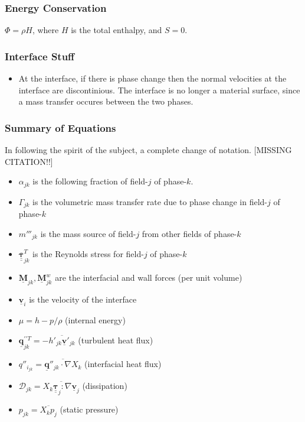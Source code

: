 \documentclass[11pt]{article}
\begin{document}
\subsubsection{Energy Conservation}
$\Phi=\rho H$, where $H$ is the total enthalpy, and $S = 0$. 
\subsubsection{Interface Stuff}
\begin{itemize}
	\item At the interface, if there is phase change then the normal velocities at the interface are discontinious. The interface is no longer a material surface, since a mass transfer occures between the two phases.
\end{itemize}

\subsubsection{Summary of Equations}
In following the spirit of the subject, a complete change of notation. [MISSING CITATION!!]
\begin{itemize}
	\item $\alpha_{jk}$ is the following fraction of field-$j$ of phase-$k$.
	\item $\Gamma_{jk}$ is the volumetric mass transfer rate due to phase change in field-$j$ of phase-$k$
	\item $m'''_{jk}$ is the mass source of field-$j$ from other fields of phase-$k$
	\item $\underline{\underline{\overline{\mathbf{\tau}}}}_{jk}^T$ is the Reynolds stress for field-$j$ of phase-$k$
	\item $\underline{\mathbf{M}}_{jk}, \underline{\mathbf{M}}_{jk}^{w}$ are the interfacial and wall forces (per unit volume)
	\item $\underline{\mathbf{v}}_{i}$ is the velocity of the interface
	\item $\mu = h - p/\rho$ (internal energy)
	\item $\underline{\mathbf{q}}^{\prime \prime T}_{jk} = - \overline{h'_{jk} \underline{\mathbf{v}}'_{jk}}$ (turbulent heat flux)
	\item $q''_{i_{jk}} = \overline{\underline{\mathbf{q}}''_{jk} \cdot \nabla X_{k}}$ (interfacial heat flux)
	\item $\mathcal{D}_{jk} = \overline{X_{k} \underline{\underline{\mathbf{\tau}}}_{j} : \nabla \underline{\mathbf{v}}_{j}}$ (dissipation)
	\item $p_{jk} = \overline{X_{k} p_{j}}$ (static pressure)
\end{itemize}
\end{document}
